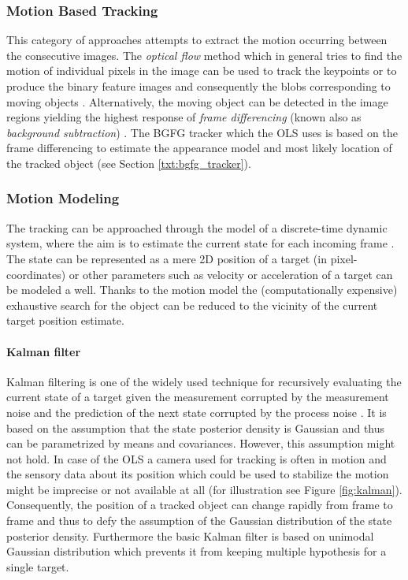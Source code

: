 \subsubsection*{Motion Based Tracking}
This category of approaches attempts to extract the motion occurring between the consecutive images. The \textit{optical flow} method which in general tries to find the motion of individual pixels in the image can be used to track the keypoints \cite{Bouguet00pyramidalimplementation} or to produce the binary feature images and consequently the blobs corresponding to moving objects \cite{aslani2013optical}. Alternatively, the moving object can be detected in the image regions yielding the highest response of \textit{frame differencing} (known also as \textit{background subtraction}) \cite{Noh2013, Movingobjectdetection}. The BGFG tracker which the OLS uses is based on the frame differencing to estimate the appearance model and most likely location of the tracked object (see Section \ref{txt:bgfg_tracker}).

\subsubsection*{Motion Modeling}
The tracking can be approached through the model of a discrete-time dynamic system, where the aim is to estimate the current state for each incoming frame \cite{Comaniciu:2003:KOT:776753.776799}. The state can be represented as a mere 2D position of a target (in pixel-coordinates) or other parameters such as velocity or acceleration of a target can be modeled a well. Thanks to the motion model the (computationally expensive) exhaustive search for the object can be reduced to the vicinity of the current target position estimate.

\paragraph{Kalman filter} 
Kalman filtering is one of the widely used technique for recursively evaluating the current state of a target given the measurement corrupted by the measurement noise and the prediction of the next state corrupted by the process noise \cite{Welch:1995:IKF:897831, cuevas2005kalman}. It is based on the assumption that the state posterior density is Gaussian and thus can be parametrized by means and covariances. However, this assumption might not hold. In case of the OLS a camera used for tracking is often in motion and the sensory data about its position which could be used to stabilize the motion might be imprecise or not available at all (for illustration see Figure \ref{fig:kalman}). Consequently, the position of a tracked object can change rapidly from frame to frame and thus to defy the assumption of the Gaussian distribution of the state posterior density. Furthermore the basic Kalman filter is based on unimodal Gaussian distribution which prevents it from keeping multiple hypothesis for a single target.

